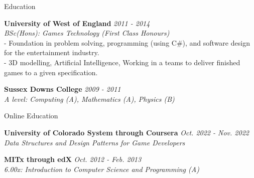 \documentclass{resume} %
\begin{document}

\begin{rSection}{Education}

{\bf University of West of England } \hfill {\em 2011 - 2014} 
\\{ \textit {BSc(Hons): Games Technology (First Class Honours)  }} 
\\- Foundation in problem solving, programming (using C\#), and software design for the entertainment industry. 
\\- 3D modelling, Artificial Intelligence, Working in a teams to deliver finished games to a given specification.

{\bf Sussex Downs College} \hfill {\em 2009 - 2011} 
\\ { \textit {A level: Computing (A), Mathematics (A), Physics (B)}} \hfill


\end{rSection}

\begin{rSection}{Online Education}

{\bf University of Colorado System through Coursera} \hfill {\em Oct. 2022 - Nov. 2022} 
\\ { \textit {Data Structures and Design Patterns for Game Developers}}

{\bf MITx through edX} \hfill {\em Oct. 2012 - Feb. 2013} 
\\ { \textit {6.00x: Introduction to Computer Science and Programming (A)}}

\end{rSection}

\end{document}
